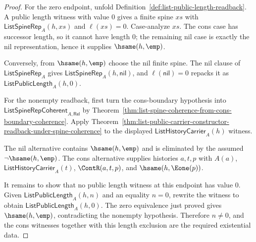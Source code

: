\begin{proof}
For the zero endpoint, unfold
Definition~\ref{def:list-public-length-readback}. A public length witness with
value $0$ gives a finite spine $xs$ with $\mathsf{ListSpineRep}_A(h,xs)$ and
$\ell(xs)=0$. Case-analyze $xs$. The cons case has successor length, so it cannot
have length $0$; the remaining nil case is exactly the nil representation, hence
it supplies $\hsame(h,\emp)$.

Conversely, from $\hsame(h,\emp)$ choose the nil finite spine. The nil clause of
$\mathsf{ListSpineRep}_A$ gives $\mathsf{ListSpineRep}_A(h,\mathsf{nil})$, and
$\ell(\mathsf{nil})=0$ repacks it as $\mathsf{ListPublicLength}_A(h,0)$.

For the nonempty readback, first turn the cons-boundary hypothesis into
$\mathsf{ListSpineRepCoherent}_{A,\mathsf{Rel}}$ by
Theorem~\ref{thm:list-spine-coherence-from-cons-boundary-coherence}. Apply
Theorem~\ref{thm:list-public-carrier-constructor-readback-under-spine-coherence}
to the displayed $\mathsf{ListHistoryCarrier}_A(h)$ witness.

The nil alternative contains $\hsame(h,\emp)$ and is eliminated by the assumed
$\neg\hsame(h,\emp)$. The cons alternative supplies histories $a,t,p$ with
$A(a)$, $\mathsf{ListHistoryCarrier}_A(t)$, $\ContR(a,t,p)$, and
$\hsame(h,\Eone(p))$.

It remains to show that no public length witness at this endpoint has value
$0$. Given $\mathsf{ListPublicLength}_A(h,n)$ and an equality $n=0$, rewrite the
witness to obtain $\mathsf{ListPublicLength}_A(h,0)$. The zero equivalence just
proved gives $\hsame(h,\emp)$, contradicting the nonempty hypothesis. Therefore
$n\neq 0$, and the cons witnesses together with this length exclusion are the
required existential data.
\end{proof}

